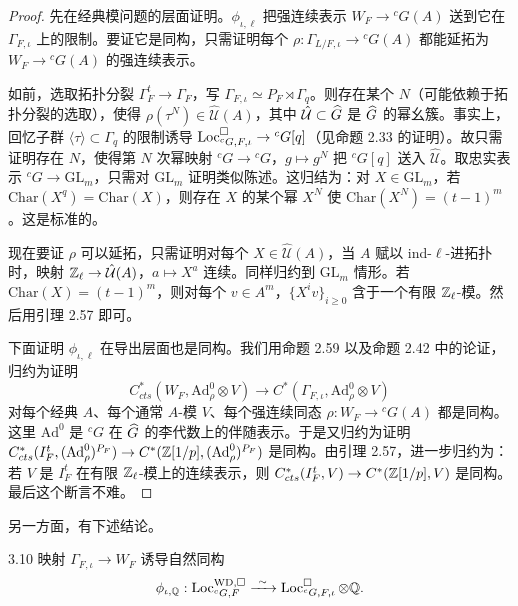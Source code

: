 \begin{proof}
先在经典模问题的层面证明。$\phi_{\iota,\ell}$ 把强连续表示 $W_F\to{}^cG(A)$ 送到它在 $\Gamma_{F,\iota}$ 上的限制。要证它是同构，只需证明每个 $\rho:\Gamma_{L/F,\iota}\to{}^cG(A)$ 都能延拓为 $W_F\to{}^cG(A)$ 的强连续表示。

如前，选取拓扑分裂 $\Gamma^t_F\to\Gamma_F$，写 $\Gamma_{F,\iota}\simeq P_F\rtimes\Gamma_q$。则存在某个 $N$（可能依赖于拓扑分裂的选取），使得 $\rho(\tau^N)\in\hat{\mathcal U}(A)$，其中 $\hat{\mathcal U}\subset\widehat{G}$ 是 $\widehat{G}$ 的幂幺簇。事实上，回忆子群 $\langle\tau\rangle\subset\Gamma_q$ 的限制诱导 $\operatorname{Loc}^{\square}_{{}^cG,F,\iota}\to{}^cG[q]$（见命题 2.33 的证明）。故只需证明存在 $N$，使得第 $N$ 次幂映射 ${}^cG\to{}^cG$，$g\mapsto g^N$ 把 ${}^cG[q]$ 送入 $\hat{\mathcal U}$。取忠实表示 ${}^cG\to\mathrm{GL}_m$，只需对 $\mathrm{GL}_m$ 证明类似陈述。这归结为：对 $X\in\mathrm{GL}_m$，若 $\mathrm{Char}(X^q)=\mathrm{Char}(X)$，则存在 $X$ 的某个幂 $X^N$ 使 $\mathrm{Char}(X^N)=(t-1)^m$。这是标准的。

现在要证 $\rho$ 可以延拓，只需证明对每个 $X\in\hat{\mathcal U}(A)$，当 $A$ 赋以 ind-$\ell$-进拓扑时，映射 $\mathbb{Z}_\ell\to\hat{\mathcal U}(A)$，$a\mapsto X^a$ 连续。同样归约到 $\mathrm{GL}_m$ 情形。若 $\mathrm{Char}(X)=(t-1)^m$，则对每个 $v\in A^m$，$\{X^iv\}_{i\geq0}$ 含于一个有限 $\mathbb{Z}_\ell$-模。然后用引理 2.57 即可。

下面证明 $\phi_{\iota,\ell}$ 在导出层面也是同构。我们用命题 2.59 以及命题 2.42 中的论证，归约为证明
\[
C^*_{cts}(W_F,\mathrm{Ad}^0_\rho\otimes V)\to C^*(\Gamma_{F,\iota},\mathrm{Ad}^0_\rho\otimes V)
\]
对每个经典 $A$、每个通常 $A$-模 $V$、每个强连续同态 $\rho:W_F\to{}^cG(A)$ 都是同构。这里 $\mathrm{Ad}^0$ 是 ${}^cG$ 在 $\widehat{G}$ 的李代数上的伴随表示。于是又归约为证明 $C^*_{cts}(I^t_F,(\mathrm{Ad}^0_\rho)^{P_F})\to C^*(\mathbb{Z}[1/p],(\mathrm{Ad}^0_\rho)^{P_F})$ 是同构。由引理 2.57，进一步归约为：若 $V$ 是 $I^t_F$ 在有限 $\mathbb{Z}_\ell$-模上的连续表示，则 $C^*_{cts}(I^t_F,V)\to C^*(\mathbb{Z}[1/p],V)$ 是同构。最后这个断言不难。
\end{proof}

另一方面，有下述结论。

\begin{lem}{3.10}
映射 $\Gamma_{F,\iota}\to W_F$ 诱导自然同构
\[
\phi_{\iota,\mathbb Q}:\Loc^{\mathrm{WD},\square}_{{}^cG,F}\xrightarrow{\ \sim\ }\Loc^{\square}_{{}^cG,F,\iota}\otimes\mathbb Q.
\]
\end{lem}

